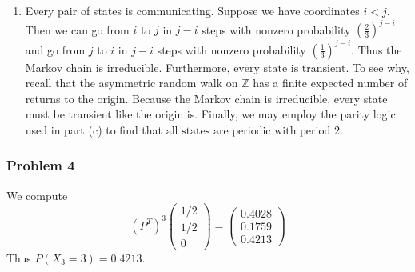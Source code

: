\documentclass[letterpaper,12pt]{article}
\begin{document}
\begin{flushleft}
\begin{enumerate}[label=(\alph*)]
        \item
        Every pair of states is communicating. Suppose we have coordinates $i < j$. Then we can go from $i$ to $j$ in $j - i$ steps with nonzero probability $\left(\frac{2}{3}\right)^{j - i}$ and go from $j$ to $i$ in $j - i$ steps with nonzero probability $\left(\frac{1}{3}\right)^{j - i}$. Thus the Markov chain is $\boxed{\text{irreducible}}$. Furthermore, $\boxed{\text{every state is transient}}$. To see why, recall that the asymmetric random walk on $\mathbb{Z}$ has a finite expected number of returns to the origin. Because the Markov chain is irreducible, every state must be transient like the origin is. Finally, we may employ the parity logic used in part (c) to find that $\boxed{\text{all states are periodic with period 2}}$.

    \end{enumerate}

    \subsubsection*{Problem 4}
    We compute
    $$(P^T)^3 \begin{pmatrix} 1/2 \\ 1/2 \\ 0 \end{pmatrix} = \begin{pmatrix} 0.4028 \\ 0.1759 \\ 0.4213 \end{pmatrix}$$
    Thus $\boxed{P(X_3 = 3) = 0.4213}$.

\end{flushleft}
\end{document}
